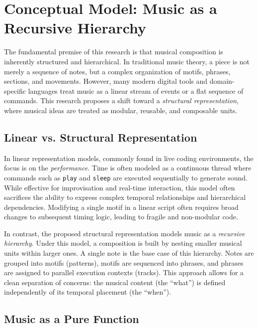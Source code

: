 \section{Conceptual Model: Music as a Recursive Hierarchy}\label{sec:conceptual-model}

The fundamental premise of this research is that musical composition is inherently structured and hierarchical.
In traditional music theory, a piece is not merely a sequence of notes, but a complex organization of motifs, phrases,
sections, and movements.
However, many modern digital tools and domain-specific languages treat music as a linear stream of events or a flat
sequence of commands.
This research proposes a shift toward a \textit{structural representation}, where musical ideas are treated as modular,
reusable, and composable units.

\subsection{Linear vs. Structural Representation}\label{subsec:linear-vs.-structural-representation}

In linear representation models, commonly found in live coding environments, the focus is on the \textit{performance}.
Time is often modeled as a continuous thread where commands such as \texttt{play} and \texttt{sleep} are executed
sequentially to generate sound.
While effective for improvisation and real-time interaction, this model often sacrifices the ability to express complex
temporal relationships and hierarchical dependencies.
Modifying a single motif in a linear script often requires broad changes to subsequent timing logic, leading to fragile
and non-modular code.

In contrast, the proposed structural representation models music as a \textit{recursive hierarchy}.
Under this model, a composition is built by nesting smaller musical units within larger ones.
A single note is the base case of this hierarchy.
Notes are grouped into motifs (patterns), motifs are sequenced into phrases, and phrases are assigned to parallel
execution contexts (tracks).
This approach allows for a clean separation of concerns: the musical content (the ``what'') is defined independently of
its temporal placement (the ``when'').

\subsection{Music as a Pure Function}\label{subsec:music-as-a-pure-function}

